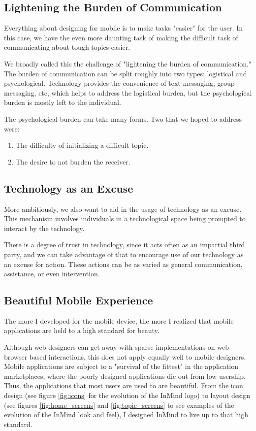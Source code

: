     \subsection{Lightening the Burden of Communication}
    Everything about designing for mobile is to make tasks "easier" for the user.
    In this case, we have the even more daunting task of making
    the difficult task of communicating about tough topics easier.

    We broadly called this the challenge of "lightening the burden of communication."
    The burden of communication can be split roughly into two types:
    logistical and psychological.
    Technology provides the convenience of text messaging,
    group messaging, etc, which helps to address the logistical burden,
    but the psychological burden is mostly left to the individual.

    The psychological burden can take many forms.
    Two that we hoped to address were:
    \begin{enumerate}
    \item The difficulty of initializing a difficult topic.
    \item The desire to not burden the receiver.
    \end{enumerate}

    \subsection{Technology as an Excuse}
    More ambitiously, we also want to aid in the usage of technology as an excuse.
    This mechanism involves individuals in a technological space being prompted
    to interact by the technology.
    
    There is a degree of trust in technology, since it acts often as an impartial third party,
    and we can take advantage of that to encourage use of our technology as an excuse for action.
    These actions can be as varied as 
    general communication,
    assistance, or even intervention.

    \subsection{Beautiful Mobile Experience}
    The more I developed for the mobile device,
    the more I realized that mobile applications are held to a high standard for beauty.

    Although web designers can get away with sparse implementations on web browser based
    interactions,
    this does not apply equally well to mobile designers.
    Mobile applications are subject to a "survival of the fittest" in the application
    marketplaces, where the poorly designed applications die out from low usership.
    Thus, the applications that most users are used to are beautiful.
    From the icon design (see figure \ref{fig:icons} for the evolution of the InMind logo)
    to layout design (see figures \ref{fig:home_screens} and \ref{fig:topic_screens}
    to see examples of the evolution of the InMind look and feel),
    I designed InMind to live up to that high standard.

